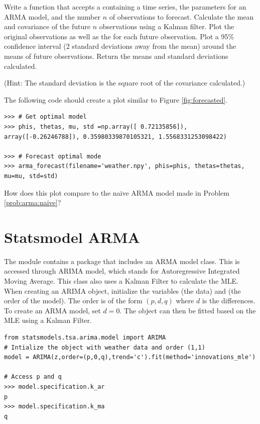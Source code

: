\begin{problem}
\label{prob:arma:forecast}
Write a function  that accepts a  containing a time series, the parameters for an ARMA model, and the number $n$ of observations to forecast.
Calculate the mean and covariance of the future $n$ observations using a Kalman filter.
Plot the original observations as well as the  for each future observation.
Plot a 95\% confidence interval (2 standard deviations away from the mean) around the means of future observations.
Return the means and standard deviations calculated.

(Hint: The standard deviation is the square root of the covariance calculated.)

The following code should create a plot similar to Figure \ref{fig:forecasted}.

\begin{lstlisting}
>>> # Get optimal model
>>> phis, thetas, mu, std =np.array([ 0.72135856]), array([-0.26246788]), 0.35980339870105321, 1.5568331253098422)

>>> # Forecast optimal mode
>>> arma_forecast(filename='weather.npy', phis=phis, thetas=thetas, mu=mu, std=std)
\end{lstlisting}

How does this plot compare to the naive ARMA model made in Problem \ref{prob:arma:naive}?
\end{problem}

\section*{Statsmodel ARMA}

The module  contains a package that includes an ARMA model class.
This is accessed through ARIMA model, which stands for Autoregressive Integrated Moving Average.
This class also uses a Kalman Filter to calculate the MLE.
When creating an ARIMA object, initialize the variables  (the data) and  (the order of the model).
The order is of the form $(p,d,q)$ where $d$ is the differences.
To create an ARMA model, set $d=0$.
The object can then be fitted based on the MLE using a Kalman Filter.

\begin{lstlisting}
from statsmodels.tsa.arima.model import ARIMA
# Intialize the object with weather data and order (1,1)
model = ARIMA(z,order=(p,0,q),trend='c').fit(method='innovations_mle')

# Access p and q
>>> model.specification.k_ar
p
>>> model.specification.k_ma
q
\end{lstlisting}

